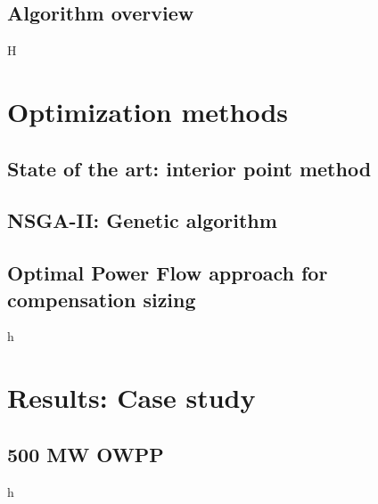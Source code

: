 \documentclass[a4paper,11pt, titlepage, twoside]{article}
\begin{document}
\newpage
\subsection{Algorithm overview}
H




\section{Optimization methods}\label{Optimization}

\subsection{State of the art: interior point method}
\subsection{NSGA-II: Genetic algorithm}
\subsection{Optimal Power Flow approach for compensation sizing}
h
\section{Results: Case study}\label{CaseStudies}

\subsection{500 MW OWPP}
h
\end{document}
